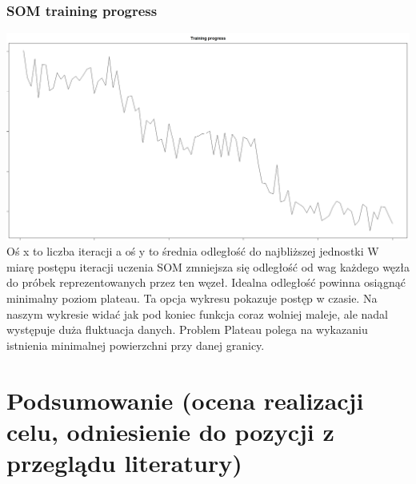 \documentclass{article}
\begin{document}
        \subsubsection{SOM training progress}
            \includegraphics[width = \textwidth]{som_changes_fig.jpeg}
            Oś x to liczba iteracji a oś y to średnia odległość do najbliższej jednostki
            W miarę postępu iteracji uczenia SOM zmniejsza się odległość od wag każdego węzła do próbek reprezentowanych przez ten węzeł.
            Idealna odległość powinna osiągnąć minimalny poziom plateau. Ta opcja wykresu pokazuje postęp w czasie. Na naszym wykresie widać 
            jak pod koniec funkcja coraz wolniej maleje, ale nadal występuje duża fluktuacja danych. 
            Problem Plateau polega na wykazaniu istnienia minimalnej powierzchni przy danej granicy.

\section{Podsumowanie (ocena realizacji celu, odniesienie do pozycji z przeglądu literatury)}
\end{document}
